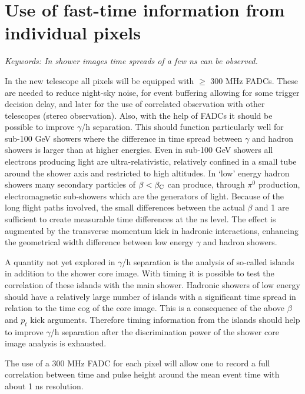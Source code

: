 \section{Use of fast-time information from individual pixels}
\par\medskip
{\it Keywords: In shower images time spreads of a
few ns can be observed.}

\par\medskip In the new telescope all pixels will be equipped 
with $\geq$ 300 MHz FADCs. These are needed 
to reduce night-sky noise, for event buffering allowing
for some trigger decision delay, and later 
for the use of correlated observation with other telescopes 
(stereo observation). Also, with the help of FADCs it should be 
possible to improve $\gamma$/h separation. This should function
particularly well for sub-100 GeV 
showers where the difference in time spread between $\gamma$ and 
hadron showers is larger than at higher 
energies. Even in sub-100 GeV showers all electrons 
producing light are ultra-relativistic, 
relatively confined in a small tube around the shower 
axis and restricted to high altitudes. In 
`low' energy hadron showers many secondary particles 
of $\beta < \beta_{\rm C}$ can produce, through $\pi^0$
production, electromagnetic sub-showers which are the 
generators of \Cerenkov light. Because 
of the long flight paths involved, the small differences
between the actual $\beta$ and 1 are 
sufficient to create measurable time differences at
the ns level. The effect is augmented by 
the transverse momentum kick in hadronic interactions, 
enhancing the geometrical width 
difference between low energy $\gamma$ and hadron showers.

A quantity not yet explored in $\gamma$/h separation is the 
analysis of so-called islands in addition to the
shower core image. With timing it is possible to test 
the correlation of these islands with the 
main shower. Hadronic showers of low energy should have
a relatively large number of 
islands with a significant time spread in relation to the time 
cog of the core image. This is a 
consequence of the above $\beta$ and $p_t$ kick arguments. Therefore
timing information from the 
islands should help to improve $\gamma$/h separation after the
discrimination power of the shower 
core image analysis is exhausted.

The use of a 300 MHz FADC for each pixel will allow
one to record a full 
correlation between time and pulse height
around the mean event time with about 1 
ns resolution.

